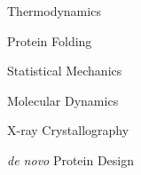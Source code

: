 \begin{description}
	\item[Topics] 
	\item Thermodynamics 
	\item Protein Folding
	\item Statistical Mechanics
	\item Molecular Dynamics
	\item X-ray Crystallography
	\item \emph{de novo} Protein Design
\end{description}